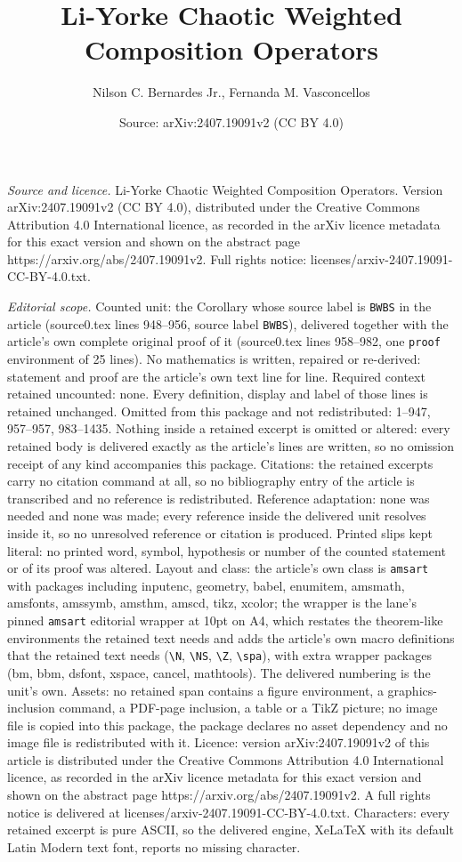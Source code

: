 \documentclass[10pt,a4paper]{amsart}
\title[Li-Yorke Chaotic Weighted Composition Operators]{Li-Yorke Chaotic Weighted Composition Operators}
\author{Nilson C. Bernardes Jr., Fernanda M. Vasconcellos}
\date{Source: arXiv:2407.19091v2 (CC BY 4.0)}
\begin{document}
\maketitle

\noindent\emph{Source and licence.} Li-Yorke Chaotic Weighted Composition Operators. Version arXiv:2407.19091v2 (CC BY 4.0), distributed under the Creative Commons Attribution 4.0 International licence, as recorded in the arXiv licence metadata for this exact version and shown on the abstract page https://arxiv.org/abs/2407.19091v2. Full rights notice: licenses/arxiv-2407.19091-CC-BY-4.0.txt.\par\smallskip

\noindent\textit{Editorial scope.} Counted unit: the Corollary whose source label is \texttt{BWBS} in the article (source0.tex lines 948--956, source label \texttt{BWBS}), delivered together with the article's own complete original proof of it (source0.tex lines 958--982, one \texttt{proof} environment of 25 lines). No mathematics is written, repaired or re-derived: statement and proof are the article's own text line for line. Required context retained uncounted: none. Every definition, display and label of those lines is retained unchanged. Omitted from this package and not redistributed: 1--947, 957--957, 983--1435. Nothing inside a retained excerpt is omitted or altered: every retained body is delivered exactly as the article's lines are written, so no omission receipt of any kind accompanies this package. Citations: the retained excerpts carry no citation command at all, so no bibliography entry of the article is transcribed and no reference is redistributed. Reference adaptation: none was needed and none was made; every reference inside the delivered unit resolves inside it, so no unresolved reference or citation is produced. Printed slips kept literal: no printed word, symbol, hypothesis or number of the counted statement or of its proof was altered. Layout and class: the article's own class is \texttt{amsart} with packages including inputenc, geometry, babel, enumitem, amsmath, amsfonts, amssymb, amsthm, amscd, tikz, xcolor; the wrapper is the lane's pinned \texttt{amsart} editorial wrapper at 10pt on A4, which restates the theorem-like environments the retained text needs and adds the article's own macro definitions that the retained text needs (\texttt{\textbackslash N}, \texttt{\textbackslash NS}, \texttt{\textbackslash Z}, \texttt{\textbackslash spa}), with extra wrapper packages (bm, bbm, dsfont, xspace, cancel, mathtools). The delivered numbering is the unit's own. Assets: no retained span contains a figure environment, a graphics-inclusion command, a PDF-page inclusion, a table or a TikZ picture; no image file is copied into this package, the package declares no asset dependency and no image file is redistributed with it. Licence: version arXiv:2407.19091v2 of this article is distributed under the Creative Commons Attribution 4.0 International licence, as recorded in the arXiv licence metadata for this exact version and shown on the abstract page https://arxiv.org/abs/2407.19091v2. A full rights notice is delivered at licenses/arxiv-2407.19091-CC-BY-4.0.txt. Characters: every retained excerpt is pure ASCII, so the delivered engine, XeLaTeX with its default Latin Modern text font, reports no missing character.
\end{document}
